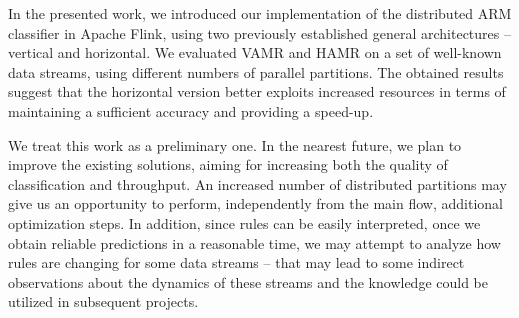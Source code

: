 \documentclass[journal]{IEEEtran}
\begin{document}
In the presented work, we introduced our implementation of the distributed ARM classifier in Apache Flink, using two previously established general architectures -- vertical and horizontal. We evaluated VAMR and HAMR on a set of well-known data streams, using different numbers of parallel partitions. The obtained results suggest that the horizontal version better exploits increased resources in terms of maintaining a sufficient accuracy and providing a speed-up.

We treat this work as a preliminary one. In the nearest future, we plan to improve the existing solutions, aiming for increasing both the quality of classification and throughput. An increased number of distributed partitions may give us an opportunity to perform, independently from the main flow, additional optimization steps. In addition, since rules can be easily interpreted, once we obtain reliable predictions in a reasonable time, we may attempt to analyze how rules are changing for some data streams -- that may lead to some indirect observations about the dynamics of these streams and the knowledge could be utilized in subsequent projects.



\end{document}
